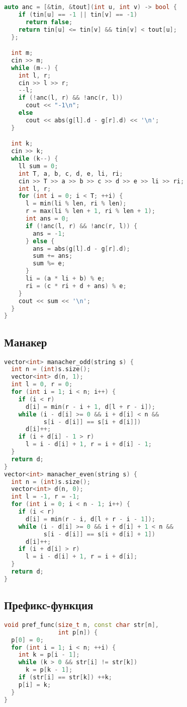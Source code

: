 \documentclass[10pt,a4paper,landscape,twosided]{extarticle}
\begin{document}
\begin{multicols}{3}
\begin{lstlisting}[language=C++]
  auto anc = [&tin, &tout](int u, int v) -> bool {
    if (tin[u] == -1 || tin[v] == -1)
      return false;
    return tin[u] <= tin[v] && tin[v] < tout[u];
  };

  int m;
  cin >> m;
  while (m--) {
    int l, r;
    cin >> l >> r;
    --l;
    if (!anc(l, r) && !anc(r, l))
      cout << "-1\n";
    else
      cout << abs(g[l].d - g[r].d) << '\n';
  }

  int k;
  cin >> k;
  while (k--) {
    ll sum = 0;
    int T, a, b, c, d, e, li, ri;
    cin >> T >> a >> b >> c >> d >> e >> li >> ri;
    int l, r;
    for (int i = 0; i < T; ++i) {
      l = min(li % len, ri % len);
      r = max(li % len + 1, ri % len + 1);
      int ans = 0;
      if (!anc(l, r) && !anc(r, l)) {
        ans = -1;
      } else {
        ans = abs(g[l].d - g[r].d);
        sum += ans;
        sum %= e;
      }
      li = (a * li + b) % e;
      ri = (c * ri + d + ans) % e;
    }
    cout << sum << '\n';
  }
}
\end{lstlisting}

\subsection{Манакер}
\begin{lstlisting}[language=C++]
vector<int> manacher_odd(string s) {
  int n = (int)s.size();
  vector<int> d(n, 1);
  int l = 0, r = 0;
  for (int i = 1; i < n; i++) {
    if (i < r)
      d[i] = min(r - i + 1, d[l + r - i]);
    while (i - d[i] >= 0 && i + d[i] < n &&
           s[i - d[i]] == s[i + d[i]])
      d[i]++;
    if (i + d[i] - 1 > r)
      l = i - d[i] + 1, r = i + d[i] - 1;
  }
  return d;
}
vector<int> manacher_even(string s) {
  int n = (int)s.size();
  vector<int> d(n, 0);
  int l = -1, r = -1;
  for (int i = 0; i < n - 1; i++) {
    if (i < r)
      d[i] = min(r - i, d[l + r - i - 1]);
    while (i - d[i] >= 0 && i + d[i] + 1 < n &&
           s[i - d[i]] == s[i + d[i] + 1])
      d[i]++;
    if (i + d[i] > r)
      l = i - d[i] + 1, r = i + d[i];
  }
  return d;
}
\end{lstlisting}

\subsection{Префикс-функция}
\begin{lstlisting}[language=C++]
void pref_func(size_t n, const char str[n],
               int p[n]) {
  p[0] = 0;
  for (int i = 1; i < n; ++i) {
    int k = p[i - 1];
    while (k > 0 && str[i] != str[k])
      k = p[k - 1];
    if (str[i] == str[k]) ++k;
    p[i] = k;
  }
}
\end{lstlisting}


\end{multicols}
\end{document}
